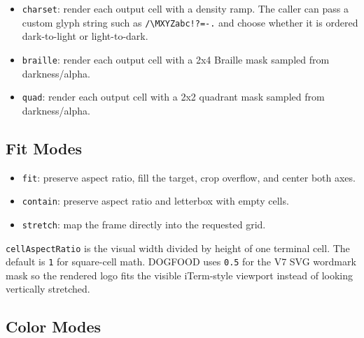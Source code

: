 \begin{itemize}
\tightlist
\item
  \texttt{c\allowbreak{}h\allowbreak{}a\allowbreak{}r\allowbreak{}s\allowbreak{}e\allowbreak{}t}: render each output cell with a density ramp. The caller can pass a custom glyph string such as \texttt{/\allowbreak{}\textbackslash{}\allowbreak{}M\allowbreak{}X\allowbreak{}Y\allowbreak{}Z\allowbreak{}a\allowbreak{}b\allowbreak{}c\allowbreak{}!\allowbreak{}?\allowbreak{}=\allowbreak{}-\allowbreak{}.} and choose whether it is ordered dark-to-light or light-to-dark.
\item
  \texttt{b\allowbreak{}r\allowbreak{}a\allowbreak{}i\allowbreak{}l\allowbreak{}l\allowbreak{}e}: render each output cell with a 2x4 Braille mask sampled from darkness/alpha.
\item
  \texttt{q\allowbreak{}u\allowbreak{}a\allowbreak{}d}: render each output cell with a 2x2 quadrant mask sampled from darkness/alpha.
\end{itemize}

\subsection{Fit Modes}\label{record-113-fit-modes}

\begin{itemize}
\tightlist
\item
  \texttt{f\allowbreak{}i\allowbreak{}t}: preserve aspect ratio, fill the target, crop overflow, and center both axes.
\item
  \texttt{c\allowbreak{}o\allowbreak{}n\allowbreak{}t\allowbreak{}a\allowbreak{}i\allowbreak{}n}: preserve aspect ratio and letterbox with empty cells.
\item
  \texttt{s\allowbreak{}t\allowbreak{}r\allowbreak{}e\allowbreak{}t\allowbreak{}c\allowbreak{}h}: map the frame directly into the requested grid.
\end{itemize}

\texttt{c\allowbreak{}e\allowbreak{}l\allowbreak{}l\allowbreak{}A\allowbreak{}s\allowbreak{}p\allowbreak{}e\allowbreak{}c\allowbreak{}t\allowbreak{}R\allowbreak{}a\allowbreak{}t\allowbreak{}i\allowbreak{}o} is the visual width divided by height of one terminal cell. The default is \texttt{1} for square-cell math. DOGFOOD uses \texttt{0\allowbreak{}.\allowbreak{}5} for the V7 SVG wordmark mask so the rendered logo fits the visible iTerm-style viewport instead of looking vertically stretched.

\subsection{Color Modes}\label{record-113-color-modes}

